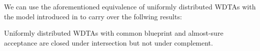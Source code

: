 We can use the aforementioned equivalence of uniformly distributed \acp{WDTA} 
with the model introduced in \cite{RandAutoInfTrees} to carry over the follwing
results:
\begin{proposition}
  \cite[Proposition 14, Proposition 15]{RandAutoInfTrees}
  Uniformly distributed \acp{WDTA} with common blueprint and almost-sure 
  acceptance are closed under intersection but not under complement.
\end{proposition}
